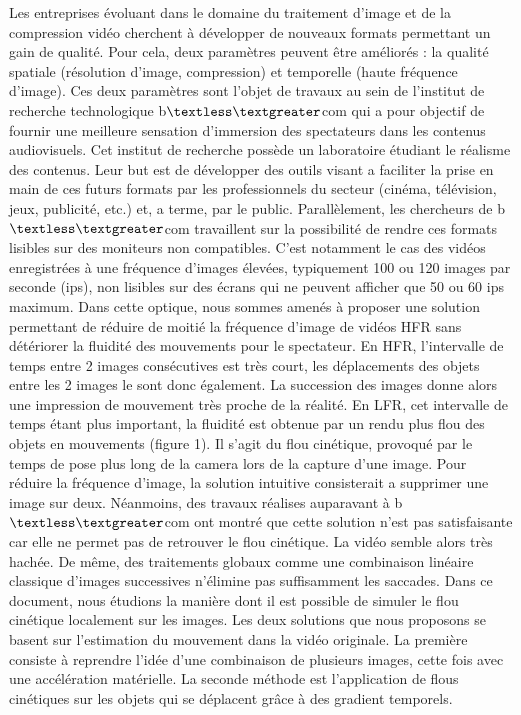 \documentclass[fleqn,10pt]{SelfArx} %
\newcommand{\bcom}{b$\textless\textgreater$com\xspace}
\begin{document}
Les entreprises évoluant dans le domaine du traitement d'image et de la compression vidéo cherchent à développer de nouveaux formats permettant un gain de qualité.
Pour cela, deux paramètres peuvent être améliorés : la qualité spatiale (résolution d'image, compression) et temporelle (haute fréquence d'image).
Ces deux paramètres sont l'objet de travaux au sein de l'institut de recherche technologique \bcom qui a pour objectif de fournir une meilleure sensation d'immersion des spectateurs dans les contenus audiovisuels.
Cet institut de recherche possède un laboratoire étudiant le réalisme des contenus.
Leur but est de développer des outils visant a faciliter la prise en main de ces futurs formats par les professionnels du secteur (cinéma, télévision, jeux, publicité, etc.) et, a terme, par le public.
Parallèlement, les chercheurs de \bcom travaillent sur la possibilité de rendre ces formats lisibles sur des moniteurs non compatibles.
C'est notamment le cas des vidéos enregistrées à une fréquence d'images élevées, typiquement 100 ou 120 images par seconde (ips), non lisibles sur des écrans qui ne peuvent afficher que 50 ou 60 ips maximum.
Dans cette optique, nous sommes amenés à proposer une solution permettant de réduire de moitié la fréquence d'image de vidéos HFR sans détériorer la fluidité des mouvements pour le spectateur.
En HFR, l'intervalle de temps entre 2 images consécutives est très court, les déplacements des objets entre les 2 images le sont donc également.
La succession des images donne alors une impression de mouvement très proche de la réalité.
En LFR, cet intervalle de temps étant plus important, la fluidité est obtenue par un rendu plus flou des objets en mouvements (figure 1). Il s'agit du flou cinétique, provoqué par le temps de pose plus long de la camera lors de la capture d'une image.
Pour réduire la fréquence d'image, la solution intuitive consisterait a supprimer une image sur deux. Néanmoins, des travaux réalises auparavant à \bcom ont montré que cette solution n'est pas satisfaisante car elle ne permet pas de retrouver le flou cinétique.
La vidéo semble alors très hachée.
De même, des traitements globaux comme une combinaison linéaire classique d'images successives n'élimine pas suffisamment les saccades.
Dans ce document, nous étudions la manière dont il est possible de simuler le flou cinétique localement sur les images.
Les deux solutions que nous proposons se basent sur l'estimation du mouvement dans la vidéo originale.
La première consiste à reprendre l'idée d'une combinaison de plusieurs images, cette fois avec une accélération matérielle.
La seconde méthode est l'application de flous cinétiques sur les objets qui se déplacent grâce à des gradient temporels.
\end{document}

